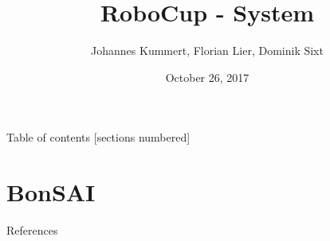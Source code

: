 \documentclass[10pt]{beamer}
\title{RoboCup - System}
\date{October 26, 2017}
\author{Johannes Kummert, Florian Lier, Dominik Sixt}
\begin{document}
\maketitle

\begin{frame}{Table of contents}
  [sections numbered]
  \tableofcontents[hideallsubsections]
\end{frame}











\section{BonSAI} %



\begin{frame}[allowframebreaks]{References}

\nocite{*}
  
  

\end{frame}
\end{document}
